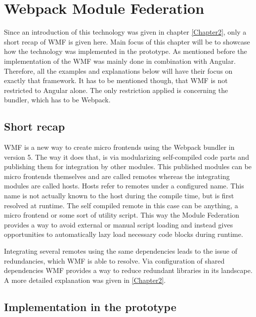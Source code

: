 \chapter{Webpack Module Federation} %
\label{Chapter5}


Since an introduction of this technology was given in chapter \ref{Chapter2}, only a short recap of WMF is given here. Main focus of this chapter will be to showcase how the technology was implemented in the prototype. As mentioned before the implementation of the WMF was mainly done in combination with Angular. Therefore, all the examples and explanations below will have their focus on exactly that framework. It has to be mentioned though, that WMF is not restricted to Angular alone. The only restriction applied is concerning the bundler, which has to be Webpack.\cite{wmf_concepts}

\section{Short recap}

WMF is a new way to create micro frontends using the Webpack bundler in version 5. The way it does that, is via modularizing self-compiled code parts and publishing them for integration by other modules. This published modules can be micro frontends themselves and are called remotes whereas the integrating modules are called hosts. 
Hosts refer to remotes under a configured name. This name is not actually known to the host during the compile time, but is first resolved at runtime.
The self compiled remote in this case can be anything, a micro frontend or some sort of utility script. This way the Module Federation provides a way to avoid external or manual script loading and instead gives opportunities to automatically lazy load necessary code blocks during runtime.\cite{wmf_concepts}

Integrating several remotes using the same dependencies leads to the issue of redundancies, which WMF is able to resolve. Via configuration of shared dependencies WMF provides a way to reduce redundant libraries in its landscape. A more detailed explanation was given in \ref{Chapter2}.

\section{Implementation in the prototype}

